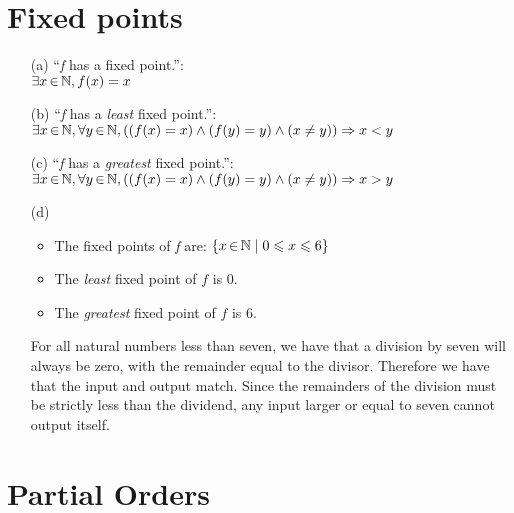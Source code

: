 \documentclass[12pt]{article}
\begin{document}
\newpage


\section{Fixed points}

\begin{enumerate}
\item[(a)] ``\emph{f} has a fixed point.'': \\
$\exists x \,{\in}\, \mathbb N, f(x) = x$

\item[(b)] ``\emph{f} has a \emph{least} fixed point.'': \\
$\exists x \,{\in}\, \mathbb N, \forall y \,{\in}\, \mathbb N, ((f(x) = x) \wedge (f(y) = y) \wedge (x \ne y)) \Rightarrow x < y$

\item[(c)] ``\emph{f} has a \emph{greatest} fixed point.'': \\
$\exists x \,{\in}\, \mathbb N, \forall y \,{\in}\, \mathbb N, ((f(x) = x) \wedge (f(y) = y) \wedge (x \ne y)) \Rightarrow x > y$

\item[(d)]
\begin{itemize}
\item The fixed points of \emph{f} are: $\{x \,{\in}\, \mathbb N \mid 0 \leqslant x \leqslant 6 \}$
\item The \emph{least} fixed point of $f$ is $0$.
\item The \emph{greatest} fixed point of $f$ is $6$.
\end{itemize}


For all natural numbers less than seven, we have that a division by seven will always be zero, with the remainder equal to the divisor. Therefore we have that the input and output match. Since the remainders of the division must be strictly less than the dividend, any input larger or equal to seven cannot output itself.

\end{enumerate}

\newpage


\section{Partial Orders}
\end{document}
